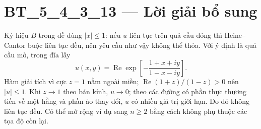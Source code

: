 \documentclass[10pt,a4paper]{article}
\begin{document}
\section*{BT\_5\_4\_3\_13 — Lời giải bổ sung}
Ký hiệu $B$ trong đề dùng $|x|\le1$: nếu $u$ liên tục trên quả cầu đóng thì Heine--Cantor buộc liên tục đều, nên yêu cầu như vậy không thể thỏa. Với ý định là quả cầu mở, trong đĩa lấy
\[u(x,y)=\operatorname{Re}\exp\left[-\frac{1+x+iy}{1-x-iy}\right].\]
Hàm giải tích vì cực $z=1$ nằm ngoài miền; $\operatorname{Re}(1+z)/(1-z)>0$ nên $|u|\le1$. Khi $z\to1$ theo bán kính, $u\to0$; theo các đường có phần thực thương tiến về một hằng và phần ảo thay đổi, $u$ có nhiều giá trị giới hạn. Do đó không liên tục đều. Có thể mở rộng ví dụ sang $n\ge2$ bằng cách không phụ thuộc các tọa độ còn lại.
\end{document}
